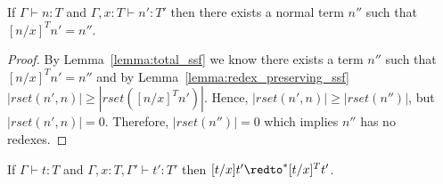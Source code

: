 \begin{lemma}
  \label{corollary:normalization_preserving_ssf}
  If $\Gamma \vdash n:T$ and $\Gamma, x:T \vdash n':T'$ then there exists a normal term $n''$ 
  such that $[n/x]^T n' = n''$.
\end{lemma}
\begin{proof}
  By Lemma~\ref{lemma:total_ssf} we know there exists a term $n''$ such that $[n/x]^T n' = n''$ and by 
Lemma~\ref{lemma:redex_preserving_ssf} 
$|rset(n', n)| \geq |rset([n/x]^T n')|$.  Hence, $|rset(n', n)| \geq |rset(n'')|$, but
$|rset(n', n)| = 0$.  Therefore, $|rset(n'')| = 0$ which implies $n''$ has no redexes.  
\end{proof}

\begin{lemma}
  \label{lemma:soundness_reduction_ssf}
  If $\Gamma \vdash t : T$ and $\Gamma, x:T, \Gamma' \vdash t':T'$ then
  $[t/x]t' \redto^* [t/x]^T t'$.
\end{lemma}
